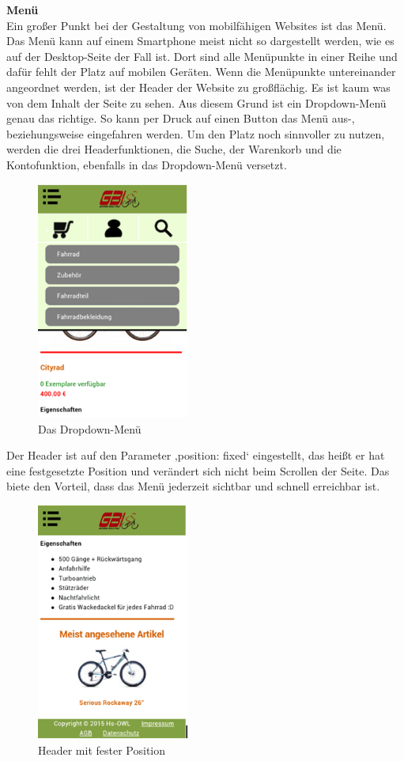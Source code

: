 \textbf{Menü}
\\
Ein großer Punkt bei der Gestaltung von mobilfähigen Websites ist das Menü. Das Menü kann auf einem Smartphone meist nicht so dargestellt werden, wie es auf der Desktop-Seite der Fall ist. Dort sind alle Menüpunkte in einer Reihe und dafür fehlt der Platz auf mobilen Geräten. Wenn die Menüpunkte untereinander angeordnet werden, ist der Header der Website zu großflächig. Es ist kaum was von dem Inhalt der Seite zu sehen. Aus diesem Grund ist ein Dropdown-Menü genau das richtige. So kann per Druck auf einen Button das Menü aus-, beziehungsweise eingefahren werden. Um den Platz noch sinnvoller zu nutzen, werden die drei Headerfunktionen, die Suche, der Warenkorb und die Kontofunktion, ebenfalls in das Dropdown-Menü versetzt.

\begin{figure}[H]
\begin{center}
\includegraphics[width=5cm]{Bilder/Michael_Abbildung5-DasDropDownMenue.png}
\end{center}
\caption{Das Dropdown-Menü}
\end{figure}

Der Header ist auf den Parameter ‚position: fixed‘ eingestellt, das heißt er hat eine festgesetzte Position und verändert sich nicht beim Scrollen der Seite. Das biete den Vorteil, dass das Menü jederzeit sichtbar und schnell erreichbar ist.

\begin{figure}[H]
\begin{center}
\includegraphics[width=5cm]{Bilder/Michael_Abbildung6-HeaderMitFesterPosition.png}
\end{center}
\caption{Header mit fester Position}
\end{figure}


